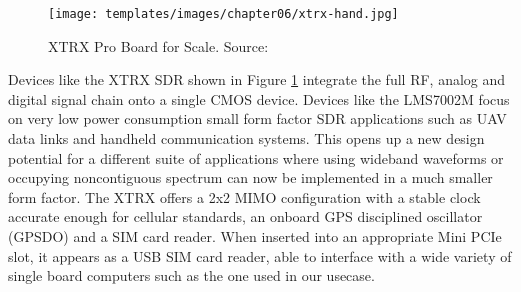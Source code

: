 
\begin{figure}[H]
    \centering
    \texttt{[image: templates/images/chapter06/xtrx-hand.jpg]}
    \caption{XTRX Pro Board for Scale. Source: \cite{xtrx-io}}
    \label{fig:xtrx-io}
\end{figure}

Devices like the XTRX SDR shown in Figure \ref{fig:xtrx-io} integrate the full RF, analog and digital signal chain onto a single CMOS device. Devices like the LMS7002M focus on very low power consumption small form factor SDR applications such as UAV data links and handheld communication systems. This opens up a new design potential for a different suite of applications where using wideband waveforms or occupying noncontiguous spectrum can now be implemented in a much smaller form factor. The XTRX offers a 2x2 MIMO configuration with a stable clock accurate enough for cellular standards, an onboard GPS disciplined oscillator (GPSDO) and a SIM card reader. When inserted into an appropriate Mini PCIe slot, it appears as a USB SIM card reader, able to interface with a wide variety of single board computers such as the one used in our usecase.

